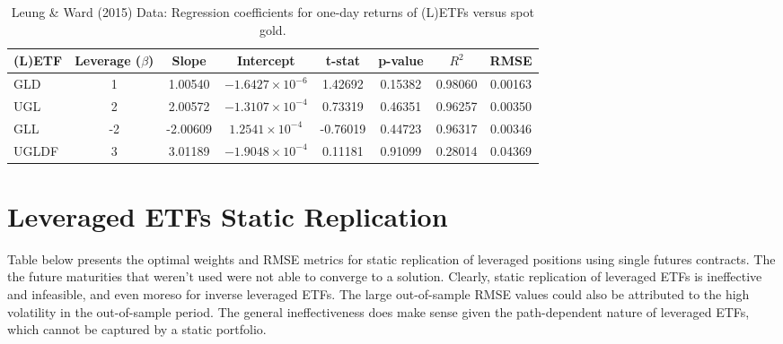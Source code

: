 \documentclass{article}
\begin{document}
\begin{table}[h!]
\centering
\begin{tabular}{lccccccc}
\toprule
\textbf{(L)ETF} & \textbf{Leverage ($\beta$)} & \textbf{Slope} & \textbf{Intercept} & \textbf{t-stat} & \textbf{p-value} & \textbf{$R^2$} & \textbf{RMSE} \\
\midrule
GLD & \phantom{-}1 & \phantom{-}1.00540 & $-1.6427 \times 10^{-6}$ & \phantom{-}1.42692 & 0.15382 & 0.98060 & 0.00163 \\
UGL & \phantom{-}2 & \phantom{-}2.00572 & $-1.3107 \times 10^{-4}$ & \phantom{-}0.73319 & 0.46351 & 0.96257 & 0.00350 \\
GLL & -2 & -2.00609 & \phantom{$-$}$1.2541 \times 10^{-4}$ & -0.76019 & 0.44723 & 0.96317 & 0.00346 \\
UGLDF & \phantom{-}3 & \phantom{-}3.01189 & $-1.9048 \times 10^{-4}$ & \phantom{-}0.11181 & 0.91099 & 0.28014 & 0.04369 \\
\bottomrule
\end{tabular}
\caption{Leung \& Ward (2015) Data: Regression coefficients for one-day returns of (L)ETFs versus spot gold.}
\label{tab:leung_ward_etf_coeffs}
\end{table}

\section{Leveraged ETFs Static Replication}

Table below presents the optimal weights and RMSE metrics for static replication of leveraged positions using single futures contracts.
The the future maturities that weren't used were not able to converge to a solution.
Clearly, static replication of leveraged ETFs is ineffective and infeasible, and even moreso for inverse leveraged ETFs.
The large out-of-sample RMSE values could also be attributed to the high volatility in the out-of-sample period.
The general ineffectiveness does make sense given the path-dependent nature of leveraged ETFs, 
which cannot be captured by a static portfolio.
\end{document}
